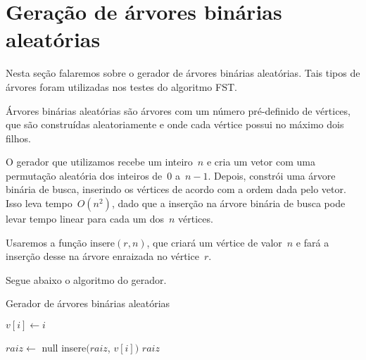 \section {Geração de árvores binárias aleatórias}

Nesta seção falaremos sobre o gerador de árvores binárias 
aleatórias. Tais tipos de árvores foram utilizadas nos 
testes do algoritmo FST.

Árvores binárias aleatórias são árvores com um número 
pré-definido de vértices, que são construídas aleatoriamente e 
onde cada vértice possui no máximo dois filhos.

O gerador que utilizamos recebe um inteiro~$n$ e cria um vetor
com uma permutação aleatória dos inteiros de~$0$ a~$n-1$.
Depois, constrói uma árvore binária de busca, inserindo 
os vértices de acordo com a ordem dada pelo vetor.
Isso leva tempo~$O(n^2)$, dado que a inserção na árvore 
binária de busca pode levar tempo linear para cada um dos~$n$ 
vértices.

Usaremos a função {\sc insere}$(r, n)$, que criará
um vértice de valor~$n$ e fará a inserção desse na árvore
enraizada no vértice~$r$.

Segue abaixo o algoritmo do gerador.

\begin{algorithm}[H]
\label{alg:ABAgenerator}

	\caption{Gerador de árvores binárias aleatórias}
	{
		$v[i] \gets i$\;
	}

	$raiz\gets$ {\sc null}\;
	{
		{\sc insere}$(raiz$, $v[i])$\;
	}
	\Return $raiz$\;

\end{algorithm}	

\bigskip
\bigskip

